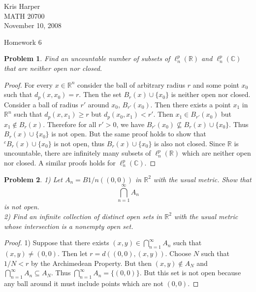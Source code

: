 \documentclass{article}
\newtheorem{problem}{Problem}
\begin{document}
\begin{flushright}
Kris Harper\\

MATH 20700\\

November 10, 2008
\end{flushright}

\begin{center}
Homework 6
\end{center}

\begin{flushleft}

\begin{problem}
Find an uncountable number of subsets of $\ell_n^p(\mathbb{R})$ and $\ell_n^p(\mathbb{C})$ that are neither open nor closed.
\end{problem}
\begin{proof}
For every $x \in \mathbb{R}^n$ consider the ball of arbitrary radius $r$ and some point $x_0$ such that $d_p(x, x_0) = r$. Then the set $B_r(x) \cup \{x_0\}$ is neither open nor closed. Consider a ball of radius $r'$ around $x_0$, $B_{r'}(x_0)$. Then there exists a point $x_1$ in $\mathbb{R}^n$ such that $d_p(x, x_1) \geq r$ but $d_p(x_0, x_1) < r'$. Then $x_1 \in B_{r'}(x_0)$ but $x_1 \notin B_r(x)$. Therefore for all $r' > 0$, we have $B_{r'}(x_0) \nsubseteq B_r(x) \cup \{x_0\}$. Thus $B_r(x) \cup \{x_0\}$ is not open. But the same proof holds to show that $^c B_r(x) \cup \{x_0\}$ is not open, thus $B_r(x) \cup \{x_0\}$ is also not closed. Since $\mathbb{R}$ is uncountable, there are infinitely many subsets of $\ell_n^p(\mathbb{R})$ which are neither open nor closed. A similar proofs holds for $\ell_n^p(\mathbb{C})$.
\end{proof}

\begin{problem}
1) Let $A_n = B{1/n}((0,0))$ in $\mathbb{R}^2$ with the usual metric. Show that
\[
\bigcap_{n=1}^{\infty} A_n
\]
is not open.\\
2) Find an infinite collection of distinct open sets in $\mathbb{R}^2$ with the usual metric whose intersection is a nonempty open set.
\end{problem}
\begin{proof}
1) Suppose that there exists $(x,y) \in \bigcap_{n=1}^{\infty} A_n$ such that $(x,y) \neq (0,0)$. Then let $r = d((0,0), (x,y))$. Choose $N$ such that $1/N < r$ by the Archimedean Property. But then $(x,y) \notin A_N$ and $\bigcap_{n=1}^{\infty} A_n \subseteq A_N$. Thus $\bigcap_{n=1}^{\infty} A_n = \{(0,0)\}$. But this set is not open because any ball around it must include points which are not $(0,0)$.\newline


\end{proof}
\end{flushleft}
\end{document}
